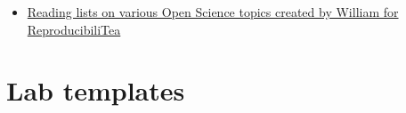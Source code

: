 \documentclass[
]{book}
\providecommand{\tightlist}{%
  \setlength{\itemsep}{0pt}\setlength{\parskip}{0pt}}
\begin{document}
\begin{itemize}
\tightlist
\item
  \href{https://williamngiam.github.io/reading_lists/}{Reading lists on various Open Science topics created by William for ReproducibiliTea}
\end{itemize}

\hypertarget{lab-templates}{%
\section{Lab templates}\label{lab-templates}}

  
\end{document}
